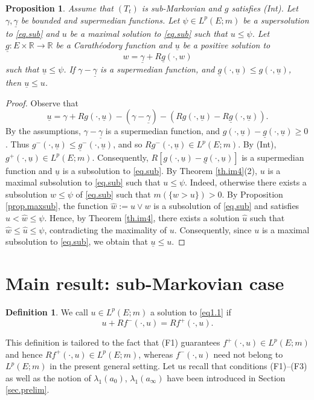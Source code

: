 \documentclass[11pt,a4paper,reqno]{amsart}
\newtheorem{proposition}[theorem]{\bf Proposition}
\theoremstyle{definition}
\newtheorem{definition}[theorem]{Definition}
\numberwithin{equation}{section}
\begin{document}
\begin{proposition}  
\label{prop4.2}
Assume that $(T_t)$ is sub-Markovian and $g$ satisfies (Int). 
Let $\gamma,\underline\gamma$ be  bounded and supermedian functions. 
Let $\psi \in L^p(E;m)$ be  a supersolution to \eqref{eq.sub} 
and  $u$ be a maximal   solution to \eqref{eq.sub}  such that $u \le \psi$.
Let  $\underline{g}:E\times\mathbb R\to\mathbb R$ be a Carath\'eodory function and $\underline{u}$ be a positive solution to 
\[
w=\underline\gamma+R\underline g(\cdot,w)
\]
such that $ \underline {u} \leq \psi$.
If $\gamma-\underline \gamma$ is a supermedian function, 
and  $\underline{g}(\cdot, \underline{u}) \leq g(\cdot, \underline{u})$,  then $\underline{u} \leq u$.
\end{proposition}
\begin{proof}
Observe that 
\[
\underline u=\gamma+Rg(\cdot,\underline u)-(\gamma-\underline\gamma)
-(Rg(\cdot,\underline u)-R\underline g(\cdot,\underline u)).
\]
By the assumptions, $\gamma-\underline\gamma$ is a supermedian function, and  
$g(\cdot, \underline{u})-\underline{g}(\cdot, \underline{u})\ge 0$. 
Thus $g^-(\cdot, \underline{u})\le \underline{g}^-(\cdot, \underline{u})$, and so 
$Rg^-(\cdot, \underline{u})\in L^p(E;m)$. By (Int), $g^+(\cdot, \underline{u}) \in L^p(E;m)$. 
Consequently, $R[g(\cdot, \underline{u})-\underline{g}(\cdot, \underline{u})]$
is a supermedian function and  $\underline{u}$ is a subsolution to \eqref{eq.sub}.
By Theorem \ref{th.im4}(2), $u$ is a maximal subsolution to \eqref{eq.sub} such that $u\le \psi$.
Indeed, otherwise there exists a subsolution $w\le\psi$ of \eqref{eq.sub} such that $m(\{w>u\})>0$. 
By Proposition \ref{prop.maxsub}, the function $\hat w:=u\vee w$ is a subsolution of \eqref{eq.sub}
and satisfies $u<\hat w\le\psi$. Hence, by Theorem \ref{th.im4}, there exists a solution $\hat u$ such that $\hat w\le\hat u\le\psi$, 
contradicting the maximality of $u$. Consequently, since $u$ is a maximal subsolution to \eqref{eq.sub}, we obtain
that   $\underline{u} \leq u$.
\end{proof}

\section{Main result:  sub-Markovian case}
\label{sec6}




\begin{definition}
\label{def.main}
 We call $u\in L^p(E;m)$ a solution to \eqref{eq1.1} if 
\[
u+Rf^-(\cdot,u)=Rf^+(\cdot,u).
\]
\end{definition}
This definition is tailored to the fact that (F1) guarantees $f^+(\cdot,u)\in L^p(E;m)$ and hence $Rf^+(\cdot,u)\in L^p(E;m)$, 
whereas  $f^-(\cdot,u)$ need not belong to $L^p(E;m)$ in the present general setting.
Let us recall that conditions (F1)--(F3) as well as the notion of  $\lambda_1(a_0)$,  $\lambda_1(a_\infty)$ have been 
introduced in Section \ref{sec.prelim}.
\end{document}
